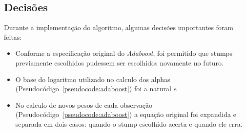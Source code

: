 \subsection{Decisões}
Durante a implementação do algoritmo, algumas decisões importantes foram feitas:

\begin{itemize}
	\item Conforme a especificação original do \emph{Adaboost}, foi permitido que stumps previamente escolhidos pudessem ser escolhidos novamente no futuro.
	\item O base do logaritmo utilizado no calculo dos alphas (Pseudocódigo~\ref{pseudocode:adaboost}) foi a natural $e$
	\item No calculo de novos pesos de cada observação (Pseudocódigo~\ref{pseudocode:adaboost}) a equação original foi expandida e separada em dois casos: quando o stump escolhido acerta e quando ele erra.
\end{itemize}







